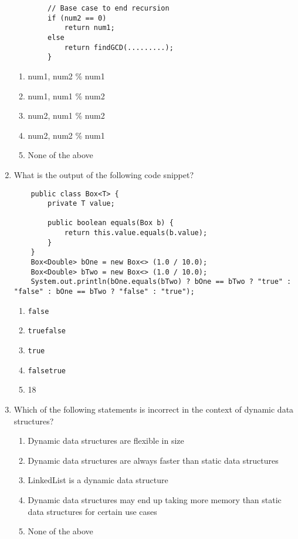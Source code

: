 \documentclass[S17-Final.tex]{subfiles}
\begin{document}
\begin{enumerate}
\begin{lstlisting}
        // Base case to end recursion
        if (num2 == 0)
            return num1;
        else
            return findGCD(.........);
        }
\end{lstlisting}
	
\begin{enumerate}
\item  num1, num2 \% num1
\item  num1, num1 \% num2
\item  num2, num1 \% num2 \ifdraft \Ans \fi 
\item  num2, num2 \% num1
\item  None of the above
\end{enumerate}
\clearpage
\item What is the output of the following code snippet?
\begin{lstlisting}
    public class Box<T> {
        private T value;
        
        public boolean equals(Box b) {
            return this.value.equals(b.value);
        }
    }
    Box<Double> bOne = new Box<> (1.0 / 10.0);
    Box<Double> bTwo = new Box<> (1.0 / 10.0);
    System.out.println(bOne.equals(bTwo) ? bOne == bTwo ? "true" : "false" : bOne == bTwo ? "false" : "true");
\end{lstlisting}
	
\begin{enumerate}
\item  \texttt{false} \ifdraft \Ans \fi 
\item  \texttt{truefalse}
\item  \texttt{true}
\item  \texttt{falsetrue}
\item  18
\end{enumerate}

\item Which of the following statements is incorrect in the context of dynamic data structures?
	
\begin{enumerate}
\item  Dynamic data structures are flexible in size
\item  Dynamic data structures are always faster than static data structures \ifdraft \Ans \fi 
\item  LinkedList is a dynamic data structure
\item  Dynamic data structures may end up taking more memory than static data structures for certain use cases
\item  None of the above
\end{enumerate}
\clearpage
    

\end{enumerate}
\end{document}
